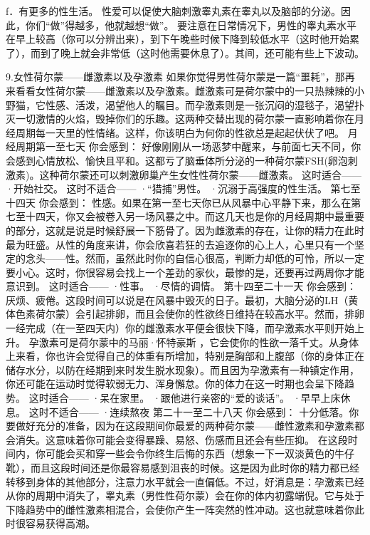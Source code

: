 \documentclass[12pt,UTF8,openany]{ctexbook}
\begin{document}
f．有更多的性生活。
性爱可以促使大脑刺激睾丸素在睾丸以及脑部的分泌。因此，你们“做”得越多，他就越想“做”。
要注意在日常情况下，男性的睾丸素水平在早上较高（你可以分辨出来），到下午晚些时候下降到较低水平（这时他开始累了），而到了晚上就会非常低（这时他需要休息了）。其间，还可能有些上下波动。

9.女性荷尔蒙——雌激素以及孕激素
如果你觉得男性荷尔蒙是一篇“噩耗”，那再来看看女性荷尔蒙——雌激素以及孕激素。雌激素可是荷尔蒙中的一只热辣辣的小野猫，它性感、活泼，渴望他人的瞩目。而孕激素则是一张沉闷的湿毯子，渴望扑灭一切激情的火焰，毁掉你们的乐趣。这两种交替出现的荷尔蒙一直影响着你在月经周期每一天里的性情绪。这样，你该明白为何你的性欲总是起起伏伏了吧。
月经周期第一至七天
你会感到：
好像刚刚从一场恶梦中醒来，与前面七天不同，你会感到心情放松、愉快且平和。这都亏了脑垂体所分泌的一种荷尔蒙FSH(卵泡刺激素)。这种荷尔蒙还可以刺激卵巢产生女性性荷尔蒙——雌激素。
这时适合——
·开始社交。
这时不适合——
·“猎捕”男性。
·沉溺于高强度的性生活。
第七至十四天
你会感到：
性感。如果在第一至七天你已从风暴中心平静下来，那么在第七至十四天，你又会被卷入另一场风暴之中。而这几天也是你的月经周期中最重要的部分，这就是说是时候舒展一下筋骨了。因为雌激素的存在，让你的精力在此时最为旺盛。从性的角度来讲，你会欣喜若狂的去追逐你的心上人，心里只有一个坚定的念头——性。然而，虽然此时你的自信心很高，判断力却低的可怜，所以一定要小心。这时，你很容易会找上一个差劲的家伙，最惨的是，还要再过两周你才能意识到。
这时适合——
·性事。
·尽情的调情。
第十四至二十一天
你会感到：
厌烦、疲倦。这段时间可以说是在风暴中毁灭的日子。最初，大脑分泌的LH（黄体色素荷尔蒙）会引起排卵，而且会使你的性欲终日维持在较高水平。然而，排卵一经完成（在一至四天内）你的雌激素水平便会很快下降，而孕激素水平则开始上升。
孕激素可是荷尔蒙中的马丽·怀特豪斯 ，它会使你的性欲一落千丈。从身体上来看，你也许会觉得自己的体重有所增加，特别是胸部和上腹部（你的身体正在储存水分，以防在经期到来时发生脱水现象）。而且因为孕激素有一种镇定作用，你还可能在运动时觉得软弱无力、浑身懈怠。你的体力在这一时期也会呈下降趋势。
这时适合——
·呆在家里。
·跟他进行亲密的“爱的谈话”。
·早早上床休息。
这时不适合——
·连续熬夜
第二十一至二十八天
你会感到：
十分低落。你要做好充分的准备，因为在这段期间你最爱的两种荷尔蒙——雌性激素和孕激素都会消失。这意味着你可能会变得暴躁、易怒、伤感而且还会有些压抑。
在这段时间内，你可能会买和穿一些会令你终生后悔的东西（想象一下一双淡黄色的牛仔靴），而且这段时间还是你最容易感到沮丧的时候。这是因为此时你的精力都已经转移到身体的其他部分，注意力水平就会一直偏低。不过，好消息是：孕激素已经从你的周期中消失了，睾丸素（男性性荷尔蒙）会在你的体内初露端倪。它与处于下降趋势中的雌性激素相混合，会使你产生一阵突然的性冲动。这也就意味着你此时很容易获得高潮。
\end{document}
